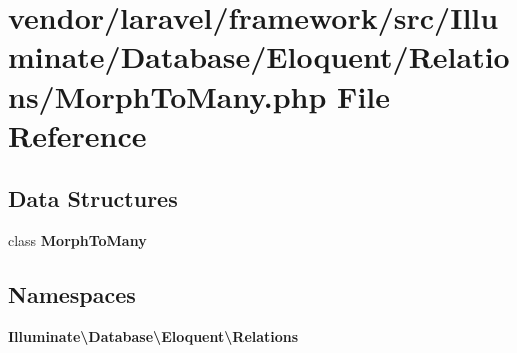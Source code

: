 \section{vendor/laravel/framework/src/\+Illuminate/\+Database/\+Eloquent/\+Relations/\+Morph\+To\+Many.php File Reference}
\label{_morph_to_many_8php}
\subsection*{Data Structures}
\begin{DoxyCompactItemize}
\item 
class {\bf Morph\+To\+Many}
\end{DoxyCompactItemize}
\subsection*{Namespaces}
\begin{DoxyCompactItemize}
\item 
 {\bf Illuminate\textbackslash{}\+Database\textbackslash{}\+Eloquent\textbackslash{}\+Relations}
\end{DoxyCompactItemize}
